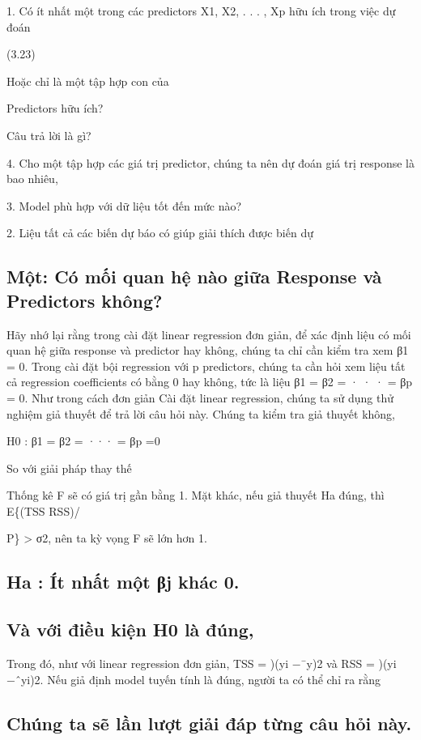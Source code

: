 1. Có ít nhất một trong các predictors X1, X2, . . . , Xp hữu ích trong việc dự đoán

(3.23)

Hoặc chỉ là một tập hợp con của

Predictors hữu ích?

Câu trả lời là gì?

4. Cho một tập hợp các giá trị predictor, chúng ta nên dự đoán giá trị response là bao nhiêu,

3. Model phù hợp với dữ liệu tốt đến mức nào?

2. Liệu tất cả các biến dự báo có giúp giải thích được biến dự

\subsection{Một: Có mối quan hệ nào giữa Response và Predictors không?}

Hãy nhớ lại rằng trong cài đặt linear regression đơn giản, để xác định liệu có mối quan hệ giữa response và predictor hay không, chúng ta chỉ cần kiểm tra xem β1 = 0. Trong cài đặt bội regression với p predictors, chúng ta cần hỏi xem liệu tất cả regression coefficients có bằng 0 hay không, tức là liệu β1 = β2 = · · · = βp = 0. Như trong cách đơn giản Cài đặt linear regression, chúng ta sử dụng thử nghiệm giả thuyết để trả lời câu hỏi này. Chúng ta kiểm tra giả thuyết không,

H0 : β1 = β2 = ··· = βp =0

So với giải pháp thay thế

Thống kê F sẽ có giá trị gần bằng 1. Mặt khác, nếu giả thuyết Ha đúng, thì E\{(TSS   RSS)/

P\} > σ2, nên ta kỳ vọng F sẽ lớn hơn 1.

\subsection{Ha : Ít nhất một βj khác 0.}

\subsection{Và với điều kiện H0 là đúng,}

Trong đó, như với linear regression đơn giản, TSS = )(yi −¯y)2 và RSS = )(yi −ˆyi)2. Nếu giả định model tuyến tính là đúng, người ta có thể chỉ ra rằng

\subsection{Chúng ta sẽ lần lượt giải đáp từng câu hỏi này.}

